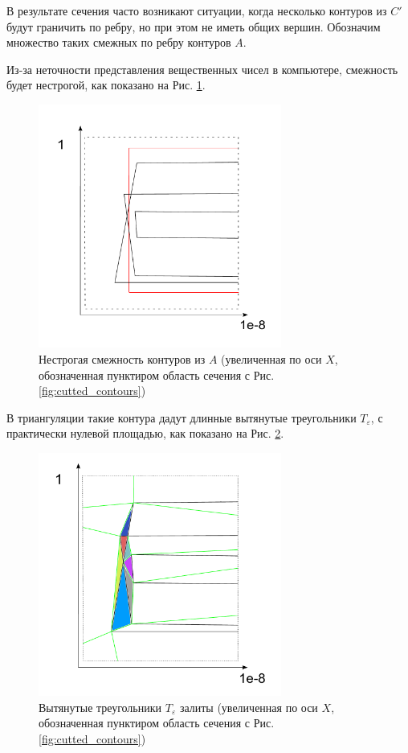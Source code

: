 \documentclass[a4paper,12pt,titlepage]{report}
\begin{document}
В результате сечения часто возникают ситуации, когда несколько контуров из $C'$ будут граничить по ребру, 
но при этом не иметь общих вершин. Обозначим множество таких смежных по ребру контуров $A$.

Из-за неточности представления вещественных чисел в компьютере,
смежность будет нестрогой, как показано на Рис. \ref{fig:zoomed_contours}.
\begin{figure}[htp]
\centering
\includegraphics[width=8cm, height=8cm]{zoomed_contours.pdf}
\caption{Нестрогая смежность контуров из $A$ (увеличенная по оси $X$, обозначенная пунктиром область сечения с Рис. \ref{fig:cutted_contours})}\label{fig:zoomed_contours}
\end{figure}
В триангуляции такие контура дадут длинные вытянутые треугольники $T_\varepsilon$, с практически нулевой площадью, 
как показано на Рис. \ref{fig:triangulation}.
\begin{figure}[htp]
\centering
\includegraphics[width=8cm, height=8cm]{triangulation.pdf}
\caption{Вытянутые треугольники $T_\varepsilon$ залиты (увеличенная по оси $X$, обозначенная пунктиром область сечения с Рис. \ref{fig:cutted_contours})}\label{fig:triangulation}
\end{figure}
\end{document}
